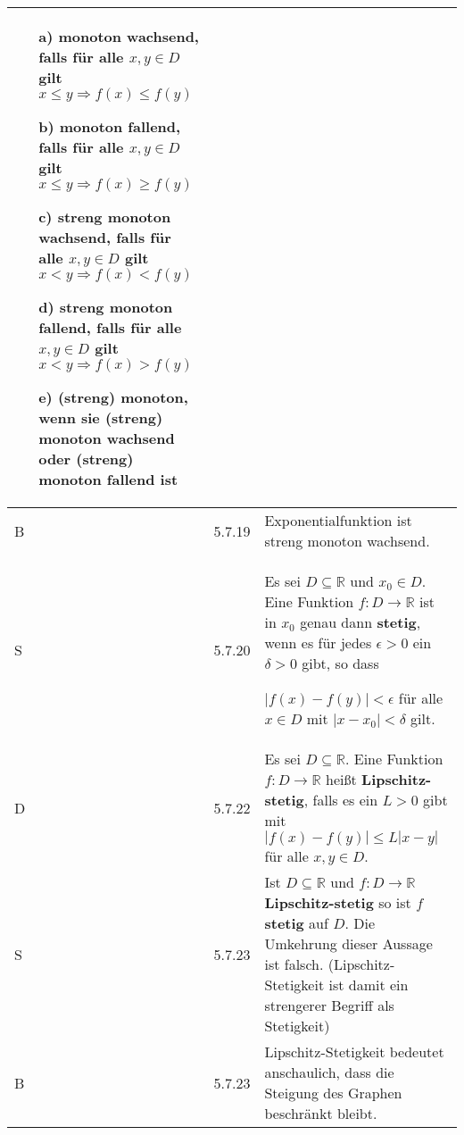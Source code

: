 \begin{longtable}{p{0.75cm} p{1cm} p{16cm}}
\begin{itemize}[topsep=-0.5cm]
                            \item[a)] \textbf{monoton wachsend}, falls für alle $x,y \in D$ gilt $x \leq y \Rightarrow f(x) \leq f(y)$
                            \item[b)] \textbf{monoton fallend}, falls für alle $x,y \in D$ gilt $x \leq y \Rightarrow f(x) \geq f(y)$
                            \item[c)] \textbf{streng monoton wachsend}, falls für alle $x,y \in D$ gilt $x < y \Rightarrow f(x) < f(y)$
                            \item[d)] \textbf{streng monoton fallend}, falls für alle $x,y \in D$ gilt $x < y \Rightarrow f(x) > f(y)$
                            \item[e)] \textbf{(streng) monoton}, wenn sie (streng) monoton wachsend oder (streng) monoton fallend ist 
                        \end{itemize} \vspace{-0cm} \\
        \midrule
        B   & 5.7.19&   Exponentialfunktion ist streng monoton wachsend. \\
        \midrule
        S   & 5.7.20&   Es sei $D \subseteq \mathbb{R}$ und $x_0 \in D$. Eine Funktion $f: D \rightarrow \mathbb{R}$ ist in $x_0$ genau dann
                        \textbf{stetig}, wenn es für jedes $\epsilon > 0$ ein $\delta > 0$ gibt, so dass \hfill \break
                        \centerline{$|f(x) - f(y)| < \epsilon$ für alle $x \in D$ mit $|x-x_0|<\delta$ gilt.} \\
        \midrule
        D   & 5.7.22&   Es sei $D \subseteq \mathbb{R}$. Eine Funktion $f : D \rightarrow \mathbb{R}$ heißt \textbf{Lipschitz-stetig}, falls
                        es ein $L > 0$ gibt mit $|f(x) - f(y)| \leq L|x-y|$ für alle $x,y \in D$. \\
        \midrule
        S   & 5.7.23&   Ist $D \subseteq \mathbb{R}$ und $f:D \rightarrow \mathbb{R}$ \textbf{Lipschitz-stetig} so ist $f$ \textbf{stetig} auf $D$.
                        Die Umkehrung dieser Aussage ist falsch. (Lipschitz-Stetigkeit ist damit ein strengerer Begriff als Stetigkeit) \\
        \midrule
        B   & 5.7.23&   Lipschitz-Stetigkeit bedeutet anschaulich, dass die Steigung des Graphen beschränkt bleibt. \\
        \bottomrule

    \end{longtable}

\pagebreak


